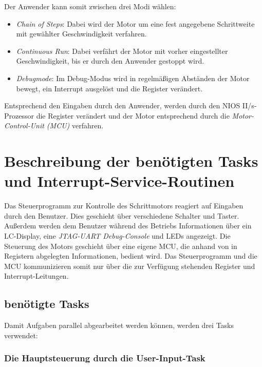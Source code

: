 \documentclass[ngerman,fontsize=12pt , paper=a4 , twoside=false , DIV12 , BCOR=1cm ,
numbers=enddot , listof=totoc , bibliography=totoc , index=totoc ,
headings=small , headlines=1.5 , final]{scrbook}
\begin{document}
Der Anwender kann somit zwischen drei Modi wählen:

\begin{itemize}
\item
  \emph{Chain of Steps}: Dabei wird der Motor um eine fest angegebene
  Schrittweite mit gewählter Geschwindigkeit verfahren.
\item
  \emph{Continuous Run}: Dabei verfährt der Motor mit vorher
  eingestellter Geschwindigkeit, bis er durch den Anwender gestoppt
  wird.
\item
  \emph{Debugmode}: Im Debug-Modus wird in regelmäßigen Abständen der
  Motor bewegt, ein Interrupt ausgelöst und die Register verändert.
\end{itemize}

Entsprechend den Eingaben durch den Anwender, werden durch den NIOS
II/s-Prozessor die Register verändert und der Motor entsprechend durch
die \emph{Motor-Control-Unit (MCU)} verfahren.

\chapter{Beschreibung der benötigten Tasks und
Interrupt-Service-Routinen}\label{beschreibung-der-benuxf6tigten-tasks-und-interrupt-service-routinen}

Das Steuerprogramm zur Kontrolle des Schrittmotors reagiert auf Eingaben
durch den Benutzer. Dies geschieht über verschiedene Schalter und
Taster. Außerdem werden dem Benutzer während des Betriebs Informationen
über ein LC-Display, eine \emph{JTAG-UART Debug-Console} und LEDs
angezeigt. Die Steuerung des Motors geschieht über eine eigene MCU, die
anhand von in Registern abgelegten Informationen, bedient wird. Das
Steuerprogramm und die MCU kommunizieren somit nur über die zur
Verfügung stehenden Register und Interrupt-Leitungen.

\section{benötigte Tasks}\label{benuxf6tigte-tasks}

Damit Aufgaben parallel abgearbeitet werden können, werden drei Tasks
verwendet:

\subsection{Die Hauptsteuerung durch die
User-Input-Task}\label{die-hauptsteuerung-durch-die-user-input-task}
\end{document}
